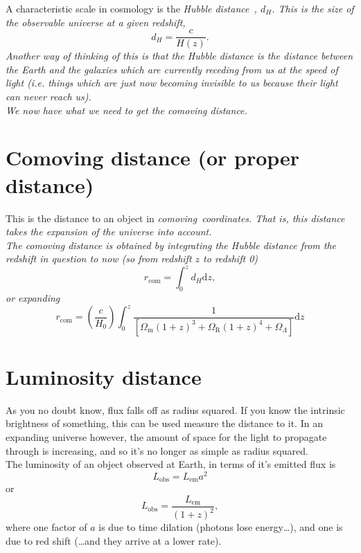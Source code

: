 \documentclass[]{article}
\begin{document}
\noindent A characteristic scale in cosmology is the \itshape Hubble distance~\upshape, $d_H$. This is the size of the observable universe at a given redshift,
\begin{equation}
d_H = \frac{c}{H(z)}.
\end{equation}
Another way of thinking of this is that the Hubble distance is the distance between the Earth and the galaxies which are currently receding from us at the speed of light (i.e. things which are just now becoming invisible to us because their light can never reach us). \\

\noindent We now have what we need to get the comoving distance.

\section{Comoving distance (or proper distance)}
This is the distance to an object in \itshape comoving~\upshape coordinates. That is, this distance takes the expansion of the universe into account. \\

\noindent The comoving distance is obtained by integrating the Hubble distance from the redshift in question to now (so from redshift $z$ to redshift 0)
\begin{equation}
r_\mathrm{com} = \int_0^z d_H \mathrm{d}z,
\end{equation}
or expanding
\begin{equation}
\boxed{r_\mathrm{com} = \left(\frac{c}{H_0}\right)\int_0^z \frac{1}{[\Omega_\mathrm{m} (1+z)^{3}+\Omega_\mathrm{R} (1+z)^{4}+\Omega_\Lambda]}\mathrm{d}z}
\end{equation}
\section{Luminosity distance}

As you no doubt know, flux falls off as radius squared. If you know the intrinsic brightness of something, this can be used measure the distance to it. In an expanding universe however, the amount of space for the light to propagate through is increasing, and so it’s no longer as simple as radius squared. \\

\noindent The luminosity of an object observed at Earth, in terms of it’s emitted flux is 
\begin{equation}
L_\mathrm{obs} = L_\mathrm{em}a^2
\end{equation}
or
\begin{equation}
L_\mathrm{obs} = \frac{L_\mathrm{em}}{(1+z)^2},
\end{equation}
where one factor of $a$ is due to time dilation (photons lose energy…), and one is due to red shift (…and they arrive at a lower rate).\\
\end{document}
